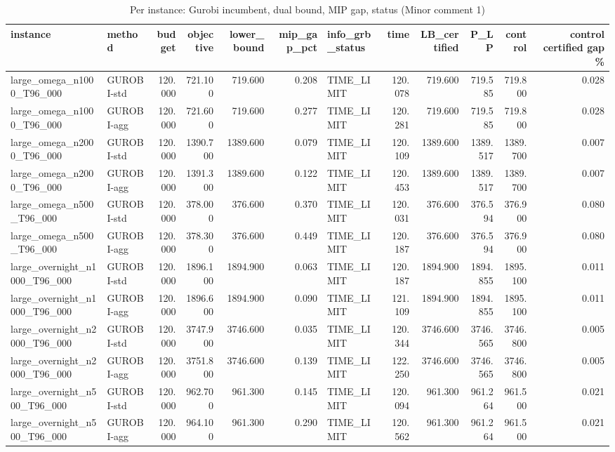 \begin{table}[htbp]
\centering
\small
\caption{Per instance: Gurobi incumbent, dual bound, MIP gap, status (Minor comment 1)}
\label{tab:E6_scalability_gurobi_per_instance}
\begin{tabular}{llrrrrlrrrrr}
\toprule
instance & method & budget & objective & lower\_bound & mip\_gap\_pct & info\_grb\_status & time & LB\_certified & P\_LP & control & control certified gap \% \\
\midrule
large\_omega\_n1000\_T96\_000 & GUROBI-std & 120.000 & 721.100 & 719.600 & 0.208 & TIME\_LIMIT & 120.078 & 719.600 & 719.585 & 719.800 & 0.028 \\
large\_omega\_n1000\_T96\_000 & GUROBI-agg & 120.000 & 721.600 & 719.600 & 0.277 & TIME\_LIMIT & 120.281 & 719.600 & 719.585 & 719.800 & 0.028 \\
large\_omega\_n2000\_T96\_000 & GUROBI-std & 120.000 & 1390.700 & 1389.600 & 0.079 & TIME\_LIMIT & 120.109 & 1389.600 & 1389.517 & 1389.700 & 0.007 \\
large\_omega\_n2000\_T96\_000 & GUROBI-agg & 120.000 & 1391.300 & 1389.600 & 0.122 & TIME\_LIMIT & 120.453 & 1389.600 & 1389.517 & 1389.700 & 0.007 \\
large\_omega\_n500\_T96\_000 & GUROBI-std & 120.000 & 378.000 & 376.600 & 0.370 & TIME\_LIMIT & 120.031 & 376.600 & 376.594 & 376.900 & 0.080 \\
large\_omega\_n500\_T96\_000 & GUROBI-agg & 120.000 & 378.300 & 376.600 & 0.449 & TIME\_LIMIT & 120.187 & 376.600 & 376.594 & 376.900 & 0.080 \\
large\_overnight\_n1000\_T96\_000 & GUROBI-std & 120.000 & 1896.100 & 1894.900 & 0.063 & TIME\_LIMIT & 120.187 & 1894.900 & 1894.855 & 1895.100 & 0.011 \\
large\_overnight\_n1000\_T96\_000 & GUROBI-agg & 120.000 & 1896.600 & 1894.900 & 0.090 & TIME\_LIMIT & 121.109 & 1894.900 & 1894.855 & 1895.100 & 0.011 \\
large\_overnight\_n2000\_T96\_000 & GUROBI-std & 120.000 & 3747.900 & 3746.600 & 0.035 & TIME\_LIMIT & 120.344 & 3746.600 & 3746.565 & 3746.800 & 0.005 \\
large\_overnight\_n2000\_T96\_000 & GUROBI-agg & 120.000 & 3751.800 & 3746.600 & 0.139 & TIME\_LIMIT & 122.250 & 3746.600 & 3746.565 & 3746.800 & 0.005 \\
large\_overnight\_n500\_T96\_000 & GUROBI-std & 120.000 & 962.700 & 961.300 & 0.145 & TIME\_LIMIT & 120.094 & 961.300 & 961.264 & 961.500 & 0.021 \\
large\_overnight\_n500\_T96\_000 & GUROBI-agg & 120.000 & 964.100 & 961.300 & 0.290 & TIME\_LIMIT & 120.562 & 961.300 & 961.264 & 961.500 & 0.021 \\

\end{tabular}
\end{table}
